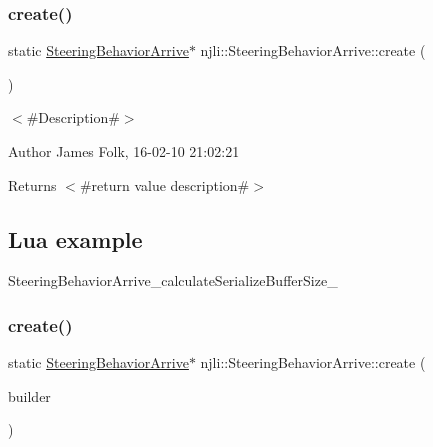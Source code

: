 \subsubsection{\texorpdfstring{create()}{create()}\hspace{0.1cm}{\footnotesize\ttfamily [1/2]}}
{\footnotesize\ttfamily static \mbox{\hyperlink{classnjli_1_1_steering_behavior_arrive}{Steering\+Behavior\+Arrive}}$\ast$ njli\+::\+Steering\+Behavior\+Arrive\+::create (\begin{DoxyParamCaption}{ }\end{DoxyParamCaption})\hspace{0.3cm}{\ttfamily [static]}}



$<$\#\+Description\#$>$ 

\begin{DoxyAuthor}{Author}
James Folk, 16-\/02-\/10 21\+:02\+:21
\end{DoxyAuthor}
\begin{DoxyReturn}{Returns}
$<$\#return value description\#$>$
\end{DoxyReturn}
\hypertarget{classnjli_1_1_steering_behavior_wander_ex1}{}\subsection{Lua example}\label{classnjli_1_1_steering_behavior_wander_ex1}

\begin{DoxyCodeInclude}
\end{DoxyCodeInclude}
Steering\+Behavior\+Arrive\+\_\+calculate\+Serialize\+Buffer\+Size\+\_\+ \mbox{\label{classnjli_1_1_steering_behavior_arrive_ae0682be1bc15506a432297ba991cba4e}} 
\subsubsection{\texorpdfstring{create()}{create()}\hspace{0.1cm}{\footnotesize\ttfamily [2/2]}}
{\footnotesize\ttfamily static \mbox{\hyperlink{classnjli_1_1_steering_behavior_arrive}{Steering\+Behavior\+Arrive}}$\ast$ njli\+::\+Steering\+Behavior\+Arrive\+::create (\begin{DoxyParamCaption}\item[{const \mbox{\hyperlink{classnjli_1_1_steering_behavior_arrive_builder}{Steering\+Behavior\+Arrive\+Builder}} \&}]{builder }\end{DoxyParamCaption})\hspace{0.3cm}{\ttfamily [static]}}



